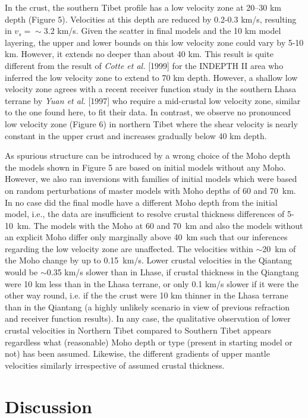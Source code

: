 \documentclass[12pt]{article}
\begin{document}
In the crust, the southern Tibet profile has a low velocity zone at 20--30 km depth (Figure 5).
Velocities at this depth are reduced by 0.2-0.3 km/s, resulting in $v_s=\sim$3.2 km/s.  Given the scatter in final
models and the 10 km model layering, the upper and lower bounds on this low velocity zone could vary by
5-10 km. However, it extends no deeper than about 40 km. This result
is quite different from the result of {\it Cotte et al.} [1999] for
the INDEPTH II area who inferred the low velocity zone to extend to 70
km depth.  However, a shallow low velocity zone agrees with a recent
receiver function study in the southern Lhasa terrane by {\it Yuan et
al.} [1997] who require a mid-crustal low velocity zone, similar to the one found here, to fit their data.  In contrast, we observe no pronounced low velocity zone (Figure 6) in northern Tibet where the shear
velocity is nearly constant in the upper crust and increases gradually below 40 km depth.

As spurious structure can be introduced by a wrong choice of the
Moho depth the models shown in Figure 5 are based on initial models
without any Moho.  However, we also ran inversions with families of
initial models which were based on random perturbations of master
models with Moho depths of 60 and 70~km.  In no case did the final
modle have a different Moho depth from the initial model, i.e., the
data are insufficient to resolve crustal thickness differences of
5-10~km.  The models with the Moho at 60 and 70~km and also the models
without an explicit Moho differ only marginally above 40~km such that
our inferences regarding the low velocity zone are unaffected.  The
velocities within $\sim$20~km of the Moho change by up to 0.15~km/s.
Lower crustal velocities in the Qiantang would be $\sim$0.35 km/s
slower than in Lhase, if crustal thickness in the Qiangtang were 10 km
less than in the Lhasa terrane, or only 0.1 km/s slower if it were the
other way round, i.e. if the the crust were 10 km thinner in the Lhasa
terrane than in the Qiantang (a highly unlikely scenario in view of
previous refraction and receiver function results).  In any case, the
qualitative observation of lower crustal velocities in Northern Tibet
compared to Southern Tibet appears regardless what (reasonable) Moho
depth or type (present in starting model or not) has been assumed.  Likewise, the different gradients of upper mantle velocities similarly irrespective of assumed crustal thickness.

\section{Discussion}
\end{document}
